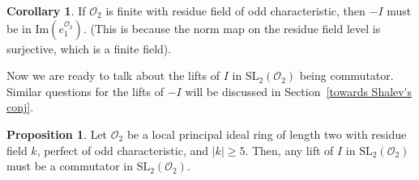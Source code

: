 \documentclass[10pt,twoside]{amsart}
\newcommand{\SL}{\mathrm{SL}}
\newcommand{\im}{\mathrm{Im}}
\newcommand{\R}{\mathcal{O}_2}
\theoremstyle{definition}
\theoremstyle{definition}
\newtheorem{corollary}[theorem]{Corollary}
\newtheorem{proposition}[theorem]{Proposition}
\begin{document}
\begin{corollary}
If $\R$ is finite with residue field of odd characteristic, then $-I$ must be in $\im(e_1^{\R})$. (This is because the norm map on the residue field level is surjective, which is a finite field).
\end{corollary}

Now we are ready to talk about the lifts of $I$ in $\SL_2(\mathcal{O}_2)$ being commutator. Similar questions for the lifts of $-I$ will be discussed in Section~\ref{towards Shalev's conj}.  
\begin{proposition}\label{prop:lift of I}
Let $\R$ be a local principal ideal ring of length two with residue field $k$, perfect of odd characteristic, and $|k|\geq 5$. Then, any lift of $I$ in $\SL_2(\mathcal{O}_2)$ must be a commutator in $\SL_2(\mathcal{O}_2)$. 
\end{proposition}
\end{document}
